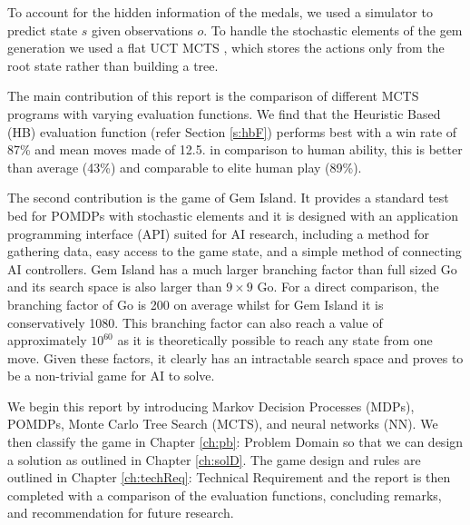 \documentclass{bhamthesis}
\theoremstyle{definition}
\begin{document}
To account for the hidden information of the medals, we used a simulator to predict state $s$ given observations $o$. To handle the stochastic elements of the gem generation we used a flat UCT MCTS \cite{Browne2012}, which stores the actions only from the root state rather than building a tree. 

The main contribution of this report is the comparison of different MCTS programs with varying evaluation functions. We find that the Heuristic Based (HB) evaluation function (refer Section \ref{s:hbF}) performs best with a win rate of 87\% and mean moves made of 12.5. in comparison to human ability, this is better than average (43\%) and comparable to elite human play (89\%).

The second contribution is the game of Gem Island. It provides a standard test bed for POMDPs with stochastic elements and it is designed with an application programming interface (API) suited for AI research, including a method for gathering data, easy access to the game state, and a simple method of connecting AI controllers. Gem Island has a much larger branching factor than full sized Go and its search space is also larger than $9 \times 9$ Go. For a direct comparison, the branching factor of Go is 200 on average \cite{Gelly2006} whilst for Gem Island it is conservatively 1080. This branching factor can also reach a value of approximately $10^{60}$ as it is theoretically possible to reach any state from one move. Given these factors, it clearly has an intractable search space and proves to be a non-trivial game for AI to solve.

We begin this report by introducing Markov Decision Processes (MDPs), POMDPs, Monte Carlo Tree Search (MCTS), and neural networks (NN). We then classify the game in Chapter \ref{ch:pb}: Problem Domain so that we can design a solution as outlined in Chapter \ref{ch:solD}. The game design and rules are outlined in Chapter \ref{ch:techReq}: Technical Requirement and the report is then completed with a comparison of the evaluation functions, concluding remarks, and recommendation for future research.
\end{document}
